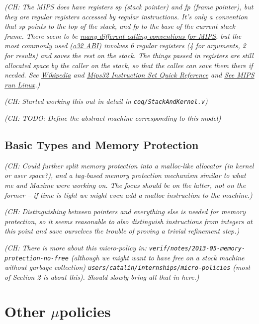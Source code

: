 \documentclass{article}
\newcommand{\ch}[1]{{\color{dkblue}\em (CH: #1)}}
\newcommand{\micro}{$\mu$}
\newcommand{\uPs}{\micro policies\xspace}
\begin{document}
\ch{The MIPS does have registers sp (stack pointer) and fp (frame
  pointer), but they are regular registers accessed by regular
  instructions. It's only a convention that sp points to the top of
  the stack, and fp to the base of the current stack frame.  There
  seem to be
  \href{http://www.linux-mips.org/wiki/WhatsWrongWithO32N32N64}{many
    different calling conventions for MIPS}, but the most commonly
  used
  (\href{http://math-atlas.sourceforge.net/devel/assembly/mipsabi32.pdf}{o32
    ABI}) involves 6 regular registers (4 for arguments, 2 for
  results) and saves the rest on the stack. The things passed in
  registers are still allocated space by the caller on the stack, so
  that the callee can save them there if needed. See
  \href{https://en.wikipedia.org/wiki/Calling_convention\#MIPS}{Wikipedia}
  and
  \href{http://www.cs.iastate.edu/~cs321/MD00565-2B-MIPS32-QRC-01.01.pdf}{Mips32
    Instruction Set Quick Reference} and
  \href{http://people.openrays.org/~comcat/godson/doc/See.MIPS.Run.2nd.en.pdf}{See
    MIPS run Linux}.}


\ch{Started working this out in detail in {\tt coq/StackAndKernel.v}}

\ch{TODO: Define the abstract machine corresponding to this model}

\subsection{Basic Types and Memory Protection}

\ch{Could further split memory protection into a malloc-like allocator
  (in kernel or user space?), and a tag-based memory protection
  mechanism similar to what me and Maxime were working on. The focus
  should be on the latter, not on the former -- if time is tight we
  might even add a malloc instruction to the machine.}

\ch{
Distinguishing between pointers and everything else is needed for
memory protection, so it seems reasonable to also distinguish
instructions from integers at this point and save ourselves the
trouble of proving a trivial refinement step.}

\ch{There is more about this micro-policy in:
{\tt verif/notes/2013-05-memory-protection-no-free}
  (although we might want to have free on a stock machine without
   garbage collection)
{\tt users/catalin/internships/micro-policies}
  (most of Section 2 is about this).
Should slowly bring all that in here.}

\section{Other \uPs}
\end{document}
